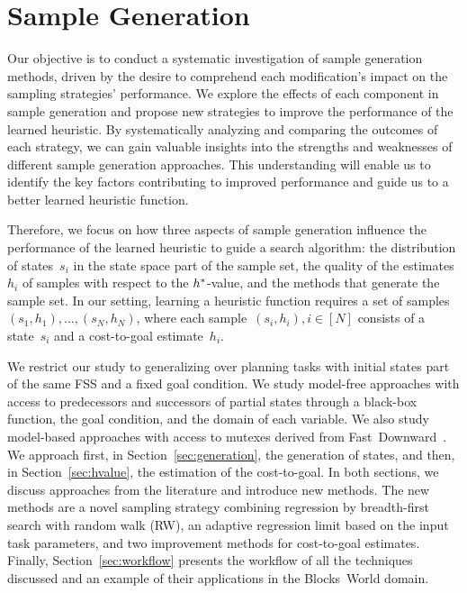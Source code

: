 \chapter{Sample Generation}
\label{sec:sampling}

Our objective is to conduct a systematic investigation of sample generation methods, driven by the desire to comprehend each modification's impact on the sampling strategies' performance. We explore the effects of each component in sample generation and propose new strategies to improve the performance of the learned heuristic. By systematically analyzing and comparing the outcomes of each strategy, we can gain valuable insights into the strengths and weaknesses of different sample generation approaches. This understanding will enable us to identify the key factors contributing to improved performance and guide us to a better learned heuristic function.

Therefore, we focus on how three aspects of sample generation influence the performance of the learned heuristic to guide a search algorithm: the distribution of states~$s_i$ in the state space part of the sample set, the quality of the estimates~$h_i$ of samples with respect to the $h^{*}$-value, and the methods that generate the sample set. In our setting, learning a heuristic function requires a set of samples~$(s_1,h_1),\ldots,(s_N,h_N)$, where each sample~$(s_i,h_i), i\in[N]$ consists of a state~$s_i$ and a cost-to-goal estimate~$h_i$.

We restrict our study to generalizing over planning tasks with initial states part of the same FSS and a fixed goal condition. We study model-free approaches with access to predecessors and successors of partial states through a black-box function, the goal condition, and the domain of each variable. We also study model-based approaches with access to mutexes derived from Fast~Downward~\cite{Helmert/2006}. We approach first, in Section~\ref{sec:generation}, the generation of states, and then, in Section~\ref{sec:hvalue}, the estimation of the cost-to-goal. In both sections, we discuss approaches from the literature and introduce new methods. The new methods are a novel sampling strategy combining regression by breadth-first search with random walk (RW), an adaptive regression limit based on the input task parameters, and two improvement methods for cost-to-goal estimates. Finally, Section~\ref{sec:workflow} presents the workflow of all the techniques discussed and an example of their applications in the Blocks~World domain.

